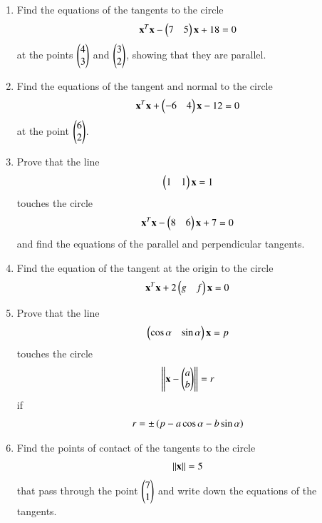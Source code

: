 \begin{enumerate}[label=\arabic*.,ref=\thesubsection.\theenumi]
\item Find the equations of the tangents to the circle
\begin{align}
\mathbf{x}^T\mathbf{x}-\begin{pmatrix}7 & 5\end{pmatrix}\mathbf{x}+18 = 0
\end{align}
at the points $\begin{pmatrix}4\\3\end{pmatrix}$ and $\begin{pmatrix}3\\2\end{pmatrix}$, showing that they are parallel.
\item Find the equations of the tangent and normal to the circle
\begin{align}
\mathbf{x}^T\mathbf{x}+\begin{pmatrix}-6 & 4\end{pmatrix}\mathbf{x}-12 = 0
\end{align}
at the point $\begin{pmatrix}6\\2\end{pmatrix}$.
\item Prove that the line 
\begin{align}
\begin{pmatrix}1 & 1\end{pmatrix}\mathbf{x} = 1
\end{align}
touches the circle
\begin{align}
\mathbf{x}^T\mathbf{x}-\begin{pmatrix}8 & 6\end{pmatrix}\mathbf{x}+7 = 0
\end{align}
and find the equations of the parallel and perpendicular tangents.
\renewcommand{\theequation}{\theenumi}
\item Find the equation of the tangent at the origin to the circle
\begin{align}
\mathbf{x}^T\mathbf{x}+2\begin{pmatrix}g & f\end{pmatrix}\mathbf{x} = 0
\end{align}
%
\item Prove that the line 
\begin{align}
\begin{pmatrix}\cos\alpha &\sin\alpha\end{pmatrix}\mathbf{x} = p
\end{align}
touches the circle
\begin{align}
\left\lVert\mathbf{x}-\begin{pmatrix}a\\b\end{pmatrix}\right\rVert=r
\end{align}
if
\begin{align}
r = \pm \left(p-a\cos\alpha-b\sin\alpha\right)
\end{align}
\renewcommand{\theequation}{\theenumi}
\item Find the points of contact of the tangents to the circle
\begin{align}
\left\lVert\mathbf{x}\right\rVert=5
\end{align}
that pass through the point $\begin{pmatrix}7\\1\end{pmatrix}$ and write down the equations of the tangents.


\end{enumerate}
